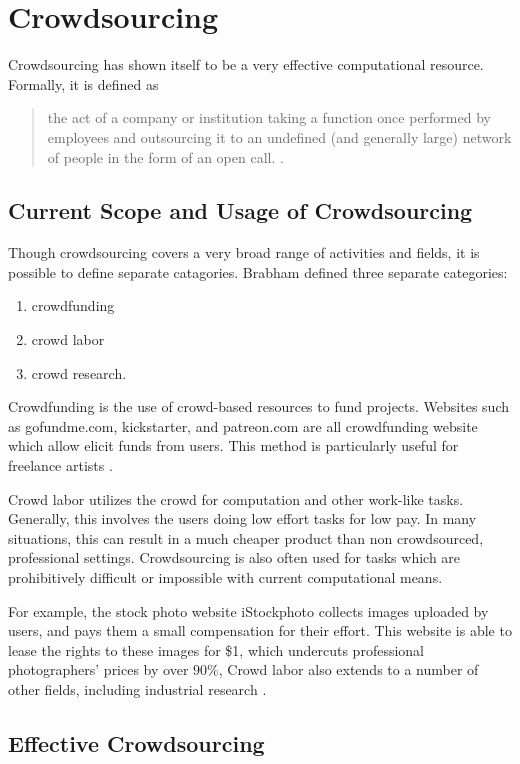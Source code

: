 
\section{Crowdsourcing}
Crowdsourcing has shown itself to be a very effective computational resource.
Formally, it is defined as
\begin{quote}
the act of a company or institution taking a function once performed by employees and outsourcing it to an undefined (and generally large) network of people in the form of an open call. \cite{brabham2008crowdsourcing}.
\end{quote}

\subsection{Current Scope and Usage of Crowdsourcing}
Though crowdsourcing covers a very broad range of activities and fields, it is possible to define separate catagories. Brabham defined three separate categories:
\begin{enumerate}
	\item crowdfunding
	\item crowd labor 
	\item crowd research.
\end{enumerate} 

Crowdfunding is the use of crowd-based resources to fund projects. Websites such as gofundme.com, kickstarter, and patreon.com are all crowdfunding website which allow elicit funds from users. 
This method is particularly useful for freelance artists \cite{brabham2008crowdsourcing}.

Crowd labor utilizes the crowd for computation and other work-like tasks. Generally, this involves the users doing low effort tasks for low pay. 
In many situations, this can result in a much cheaper product than non crowdsourced, professional settings.
Crowdsourcing is also often used for tasks which are prohibitively difficult or impossible with current computational means.

For example, the stock photo website iStockphoto collects images uploaded by users, and pays them a small compensation for their effort. 
This website is able to lease the rights to these images for \$1, which undercuts professional photographers' prices by over $90\%$, Crowd labor also extends to a number of other fields, including industrial research \cite{howe2006rise}.

\subsection{Effective Crowdsourcing}




